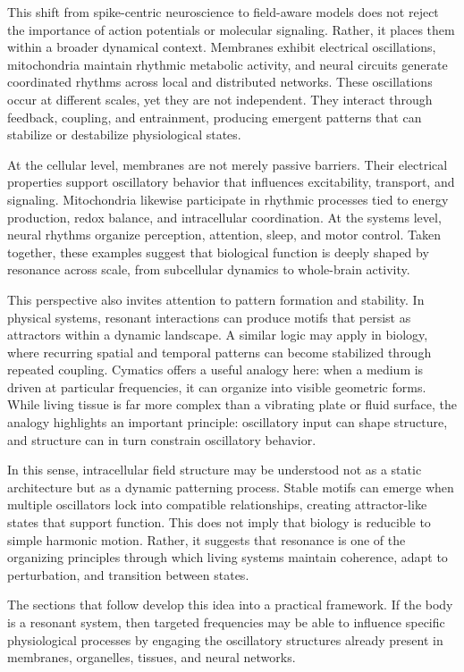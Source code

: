 \documentclass[11pt]{article}
\begin{document}
This shift from spike-centric neuroscience to field-aware models does not reject the importance of action potentials or molecular signaling. Rather, it places them within a broader dynamical context. Membranes exhibit electrical oscillations, mitochondria maintain rhythmic metabolic activity, and neural circuits generate coordinated rhythms across local and distributed networks. These oscillations occur at different scales, yet they are not independent. They interact through feedback, coupling, and entrainment, producing emergent patterns that can stabilize or destabilize physiological states.

At the cellular level, membranes are not merely passive barriers. Their electrical properties support oscillatory behavior that influences excitability, transport, and signaling. Mitochondria likewise participate in rhythmic processes tied to energy production, redox balance, and intracellular coordination. At the systems level, neural rhythms organize perception, attention, sleep, and motor control. Taken together, these examples suggest that biological function is deeply shaped by resonance across scale, from subcellular dynamics to whole-brain activity.

This perspective also invites attention to pattern formation and stability. In physical systems, resonant interactions can produce motifs that persist as attractors within a dynamic landscape. A similar logic may apply in biology, where recurring spatial and temporal patterns can become stabilized through repeated coupling. Cymatics offers a useful analogy here: when a medium is driven at particular frequencies, it can organize into visible geometric forms. While living tissue is far more complex than a vibrating plate or fluid surface, the analogy highlights an important principle: oscillatory input can shape structure, and structure can in turn constrain oscillatory behavior.

In this sense, intracellular field structure may be understood not as a static architecture but as a dynamic patterning process. Stable motifs can emerge when multiple oscillators lock into compatible relationships, creating attractor-like states that support function. This does not imply that biology is reducible to simple harmonic motion. Rather, it suggests that resonance is one of the organizing principles through which living systems maintain coherence, adapt to perturbation, and transition between states.

The sections that follow develop this idea into a practical framework. If the body is a resonant system, then targeted frequencies may be able to influence specific physiological processes by engaging the oscillatory structures already present in membranes, organelles, tissues, and neural networks.
\end{document}
